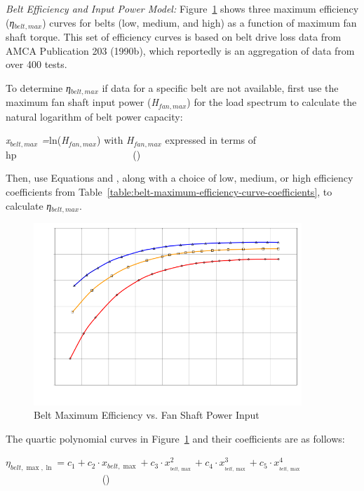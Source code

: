 \emph{Belt Efficiency and Input Power Model:} Figure~\ref{fig:belt-maximum-efficiency-vs.-fan-shaft-power} shows three maximum efficiency (\emph{η\(_{belt,max}\)}) curves for belts (low, medium, and high) as a function of maximum fan shaft torque. This set of efficiency curves is based on belt drive loss data from AMCA Publication 203 (1990b), which reportedly is an aggregation of data from over 400 tests.

To determine \emph{η\(_{belt,max}\)} if data for a specific belt are not available, first use the maximum fan shaft input power (\emph{H\(_{fan,max}\)}) for the load spectrum to calculate the natural logarithm of belt power capacity:

\emph{x\(_{belt,max}\) =}ln(\emph{H\(_{fan,max}\)}) with \emph{H\(_{fan,max}\)} expressed in terms of hp~~~~~~~~~~~~~~~~~~~~~~~ ()

Then, use Equations and , along with a choice of low, medium, or high efficiency coefficients from Table~\ref{table:belt-maximum-efficiency-curve-coefficients}, to calculate \emph{η\(_{belt,max}\)}.

\begin{figure}[hbtp] %
\centering
\includegraphics[width=0.9\textwidth, height=0.9\textheight, keepaspectratio=true]{media/image4907.svg.png}
\caption{Belt Maximum Efficiency vs. Fan Shaft Power Input \protect \label{fig:belt-maximum-efficiency-vs.-fan-shaft-power}}
\end{figure}

The quartic polynomial curves in Figure~\ref{fig:belt-maximum-efficiency-vs.-fan-shaft-power} and their coefficients are as follows:

\({\eta_{belt,\max ,\ln }} = {c_1} + {c_2} \cdot {x_{belt,\max }} + {c_3} \cdot x_{_{belt,\max }}^2 + {c_4} \cdot x_{_{belt,\max }}^3 + {c_5} \cdot x_{_{belt,\max }}^4\) ~~~~~~~~~~~~~~~~~~~ ()

